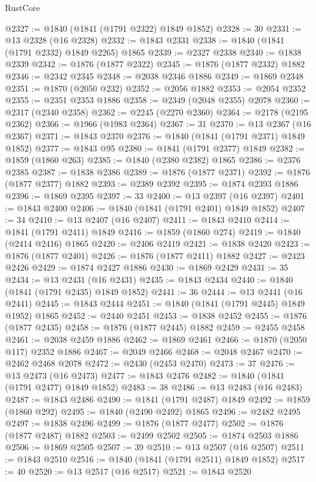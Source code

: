 \begin{lexlean}{RustCore}
\begin{coremodule}
@2327 := @1840 (@1841 (@1791 @2322) @1849 @1852)
@2328 := 30
@2331 := @13 @2328 (@16 @2328)
@2332 := @1843 @2331
@2338 := @1840 (@1841 (@1791 @2332) @1849 @2265) @1865
@2339 := @2327 @2338
@2340 := @1838 @2339
@2342 := @1876 (@1877 @2322)
@2345 := @1876 (@1877 @2332) @1882
@2346 := @2342 @2345
@2348 := @2038 @2346 @1886
@2349 := @1869 @2348
@2351 := @1870 (@2050 @232)
@2352 := @2056 @1882
@2353 := @2054 @2352
@2355 := @2351 @2353 @1886
@2358 := @2349 (@2048 @2355) @2078
@2360 := @2317 (@2340 @2358)
@2362 := @2245 (@2270 @2360)
@2364 := @2178 (@2195 @2362)
@2366 := @1966 (@1983 @2364)
@2367 := 31
@2370 := @13 @2367 (@16 @2367)
@2371 := @1843 @2370
@2376 := @1840 (@1841 (@1791 @2371) @1849 @1852)
@2377 := @1843 @95
@2380 := @1841 (@1791 @2377) @1849
@2382 := @1859 (@1860 @263)
@2385 := @1840 (@2380 @2382) @1865
@2386 := @2376 @2385
@2387 := @1838 @2386
@2389 := @1876 (@1877 @2371)
@2392 := @1876 (@1877 @2377) @1882
@2393 := @2389 @2392
@2395 := @1874 @2393 @1886
@2396 := @1869 @2395
@2397 := 33
@2400 := @13 @2397 (@16 @2397)
@2401 := @1843 @2400
@2406 := @1840 (@1841 (@1791 @2401) @1849 @1852)
@2407 := 34
@2410 := @13 @2407 (@16 @2407)
@2411 := @1843 @2410
@2414 := @1841 (@1791 @2411) @1849
@2416 := @1859 (@1860 @274)
@2419 := @1840 (@2414 @2416) @1865
@2420 := @2406 @2419
@2421 := @1838 @2420
@2423 := @1876 (@1877 @2401)
@2426 := @1876 (@1877 @2411) @1882
@2427 := @2423 @2426
@2429 := @1874 @2427 @1886
@2430 := @1869 @2429
@2431 := 35
@2434 := @13 @2431 (@16 @2431)
@2435 := @1843 @2434
@2440 := @1840 (@1841 (@1791 @2435) @1849 @1852)
@2441 := 36
@2444 := @13 @2441 (@16 @2441)
@2445 := @1843 @2444
@2451 := @1840 (@1841 (@1791 @2445) @1849 @1952) @1865
@2452 := @2440 @2451
@2453 := @1838 @2452
@2455 := @1876 (@1877 @2435)
@2458 := @1876 (@1877 @2445) @1882
@2459 := @2455 @2458
@2461 := @2038 @2459 @1886
@2462 := @1869 @2461
@2466 := @1870 (@2050 @117) @2352 @1886
@2467 := @2049 @2466
@2468 := @2048 @2467
@2470 := @2462 @2468 @2078
@2472 := @2430 (@2453 @2470)
@2473 := 37
@2476 := @13 @2473 (@16 @2473)
@2477 := @1843 @2476
@2482 := @1840 (@1841 (@1791 @2477) @1849 @1852)
@2483 := 38
@2486 := @13 @2483 (@16 @2483)
@2487 := @1843 @2486
@2490 := @1841 (@1791 @2487) @1849
@2492 := @1859 (@1860 @292)
@2495 := @1840 (@2490 @2492) @1865
@2496 := @2482 @2495
@2497 := @1838 @2496
@2499 := @1876 (@1877 @2477)
@2502 := @1876 (@1877 @2487) @1882
@2503 := @2499 @2502
@2505 := @1874 @2503 @1886
@2506 := @1869 @2505
@2507 := 39
@2510 := @13 @2507 (@16 @2507)
@2511 := @1843 @2510
@2516 := @1840 (@1841 (@1791 @2511) @1849 @1852)
@2517 := 40
@2520 := @13 @2517 (@16 @2517)
@2521 := @1843 @2520

\end{coremodule}
\end{lexlean}
